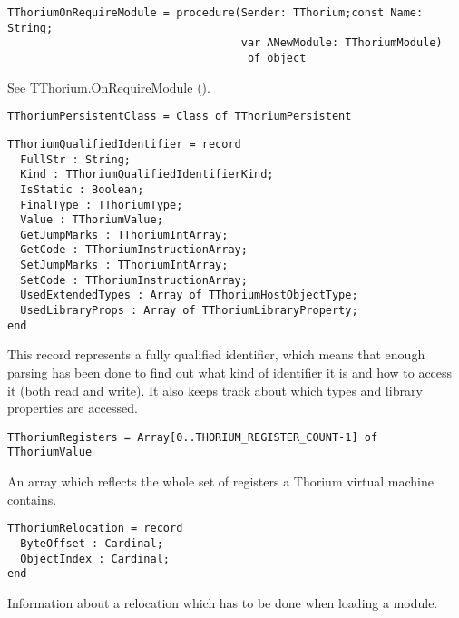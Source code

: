 \begin{verbatim}
TThoriumOnRequireModule = procedure(Sender: TThorium;const Name: String;
                                    var ANewModule: TThoriumModule)
                                     of object
\end{verbatim}
\label{thoriumcorepkg:thorium:tthoriumonrequiremodule}
See TThorium.OnRequireModule (\pageref{thoriumcorepkg:thorium:tthorium:onrequiremodule}).


\begin{verbatim}
TThoriumPersistentClass = Class of TThoriumPersistent
\end{verbatim}
\label{thoriumcorepkg:thorium:tthoriumpersistentclass}



\begin{verbatim}
TThoriumQualifiedIdentifier = record
  FullStr : String;
  Kind : TThoriumQualifiedIdentifierKind;
  IsStatic : Boolean;
  FinalType : TThoriumType;
  Value : TThoriumValue;
  GetJumpMarks : TThoriumIntArray;
  GetCode : TThoriumInstructionArray;
  SetJumpMarks : TThoriumIntArray;
  SetCode : TThoriumInstructionArray;
  UsedExtendedTypes : Array of TThoriumHostObjectType;
  UsedLibraryProps : Array of TThoriumLibraryProperty;
end

\end{verbatim}
\label{thoriumcorepkg:thorium:tthoriumqualifiedidentifier}
This record represents a fully qualified identifier, which means that enough parsing has been done to find out what kind of identifier it is and how to access it (both read and write). It also keeps track about which types and library properties are accessed.


\begin{verbatim}
TThoriumRegisters = Array[0..THORIUM_REGISTER_COUNT-1] of TThoriumValue
\end{verbatim}
\label{thoriumcorepkg:thorium:tthoriumregisters}
An array which reflects the whole set of registers a Thorium virtual machine contains.


\begin{verbatim}
TThoriumRelocation = record
  ByteOffset : Cardinal;
  ObjectIndex : Cardinal;
end

\end{verbatim}
\label{thoriumcorepkg:thorium:tthoriumrelocation}
Information about a relocation which has to be done when loading a module.


